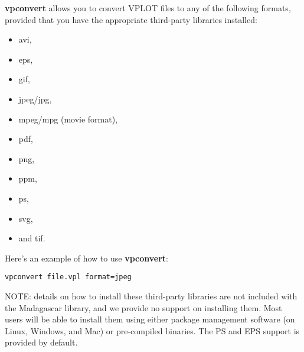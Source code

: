 \textbf{vpconvert} allows you to convert VPLOT files to any of the following formats, provided that you have the appropriate third-party libraries installed: 
\begin{itemize}
\item avi, 
\item eps,
\item gif, 
\item jpeg/jpg,
\item mpeg/mpg (movie format),
\item pdf,
\item png,
\item ppm,
\item ps,
\item svg,
\item and tif.
\end{itemize}
Here's an example of how to use \textbf{vpconvert}:
\begin{verbatim}
vpconvert file.vpl format=jpeg
\end{verbatim}

NOTE: details on how to install these third-party libraries are not
included with the Madagascar library, and we provide no support on
installing them.  Most users will be able to install them using either
package management software (on Linux, Windows, and Mac) or
pre-compiled binaries. The PS and EPS support is provided by default.
